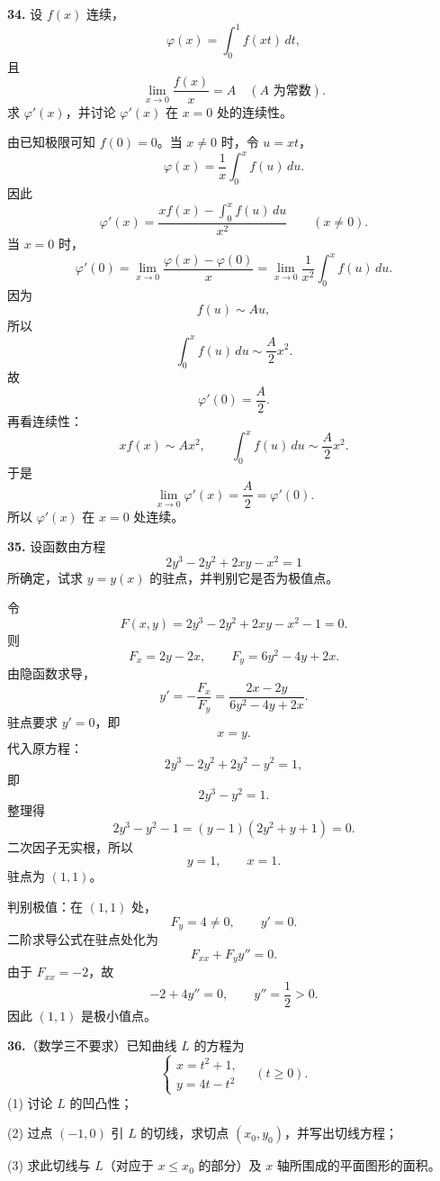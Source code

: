 \begin{problemblock}
\textbf{34.} 设 \(f(x)\) 连续，
\[
\varphi(x)=\int_0^1 f(xt)\,dt,
\]
且
\[
\lim_{x\to0}\frac{f(x)}x=A\quad(A\text{ 为常数}).
\]
求 \(\varphi'(x)\)，并讨论 \(\varphi'(x)\) 在 \(x=0\) 处的连续性。
\end{problemblock}

\begin{solutionblock}
由已知极限可知 \(f(0)=0\)。当 \(x\ne0\) 时，令 \(u=xt\)，
\[
\varphi(x)=\frac1x\int_0^x f(u)\,du.
\]
因此
\[
\varphi'(x)=\frac{x f(x)-\int_0^x f(u)\,du}{x^2}\qquad(x\ne0).
\]
当 \(x=0\) 时，
\[
\varphi'(0)=\lim_{x\to0}\frac{\varphi(x)-\varphi(0)}x
=\lim_{x\to0}\frac1{x^2}\int_0^x f(u)\,du.
\]
因为
\[
f(u)\sim Au,
\]
所以
\[
\int_0^x f(u)\,du\sim\frac A2x^2.
\]
故
\[
\varphi'(0)=\frac A2.
\]
再看连续性：
\[
x f(x)\sim Ax^2,\qquad
\int_0^x f(u)\,du\sim\frac A2x^2.
\]
于是
\[
\lim_{x\to0}\varphi'(x)
=\frac A2
=\varphi'(0).
\]
所以 \(\varphi'(x)\) 在 \(x=0\) 处连续。
\end{solutionblock}

\begin{problemblock}
\textbf{35.} 设函数由方程
\[
2y^3-2y^2+2xy-x^2=1
\]
所确定，试求 \(y=y(x)\) 的驻点，并判别它是否为极值点。
\end{problemblock}

\begin{solutionblock}
令
\[
F(x,y)=2y^3-2y^2+2xy-x^2-1=0.
\]
则
\[
F_x=2y-2x,\qquad
F_y=6y^2-4y+2x.
\]
由隐函数求导，
\[
y'=-\frac{F_x}{F_y}
=\frac{2x-2y}{6y^2-4y+2x}.
\]
驻点要求 \(y'=0\)，即
\[
x=y.
\]
代入原方程：
\[
2y^3-2y^2+2y^2-y^2=1,
\]
即
\[
2y^3-y^2=1.
\]
整理得
\[
2y^3-y^2-1=(y-1)(2y^2+y+1)=0.
\]
二次因子无实根，所以
\[
y=1,\qquad x=1.
\]
驻点为 \((1,1)\)。

判别极值：在 \((1,1)\) 处，
\[
F_y=4\ne0,\qquad y'=0.
\]
二阶求导公式在驻点处化为
\[
F_{xx}+F_y y''=0.
\]
由于 \(F_{xx}=-2\)，故
\[
-2+4y''=0,\qquad y''=\frac12>0.
\]
因此 \((1,1)\) 是极小值点。
\end{solutionblock}

\begin{problemblock}
\textbf{36.}（数学三不要求）已知曲线 \(L\) 的方程为
\[
\begin{cases}
x=t^2+1,\\
y=4t-t^2
\end{cases}
\quad(t\ge0).
\]
(1) 讨论 \(L\) 的凹凸性；

(2) 过点 \((-1,0)\) 引 \(L\) 的切线，求切点 \((x_0,y_0)\)，并写出切线方程；

(3) 求此切线与 \(L\)（对应于 \(x\le x_0\) 的部分）及 \(x\) 轴所围成的平面图形的面积。
\end{problemblock}

